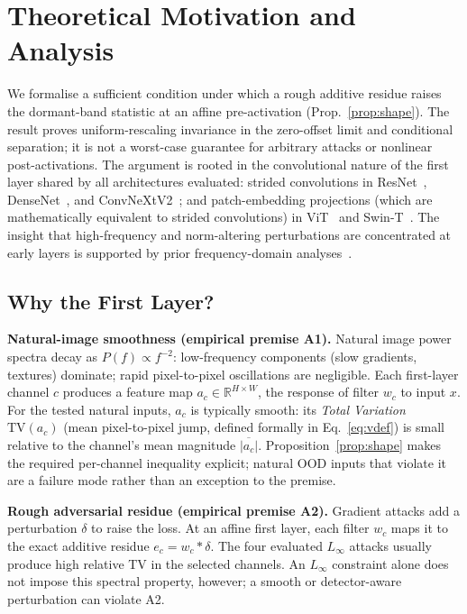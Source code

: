 \documentclass[10pt,letterpaper,journal]{IEEEtran}
\begin{document}
\section{Theoretical Motivation and Analysis}
\label{sec:theory}

We formalise a sufficient condition under which a rough additive residue raises
the dormant-band statistic at an affine pre-activation
(Prop.~\ref{prop:shape}). The result proves uniform-rescaling invariance in the
zero-offset limit and conditional separation; it is not a worst-case guarantee
for arbitrary attacks or nonlinear post-activations. The argument is rooted
in the convolutional nature of the first layer shared by all architectures
evaluated: strided convolutions in ResNet~\cite{he2016deep},
DenseNet~\cite{huang2017densely}, and ConvNeXtV2~\cite{woo2023convnext};
and patch-embedding projections (which are mathematically equivalent to
strided convolutions) in ViT~\cite{dosovitskiy2020image} and
Swin-T~\cite{liu2021swin}. The insight that high-frequency and norm-altering
perturbations are concentrated at early layers is supported by prior
frequency-domain analyses~\cite{wang2020high,wang2020towards,ziyadinov2023low}.

\subsection{Why the First Layer?}
\label{ssec:rawbaseline}

\noindent\textbf{Natural-image smoothness (empirical premise A1).}
Natural image power spectra decay as $P(f)\!\propto\!f^{-2}$: low-frequency
components (slow gradients, textures) dominate; rapid pixel-to-pixel oscillations
are negligible.  Each first-layer channel $c$ produces a feature map
$a_c\in\mathbb{R}^{H\times W}$, the response of filter $w_c$ to input $x$.
For the tested natural inputs, $a_c$ is typically smooth: its
\emph{Total Variation} $\mathrm{TV}(a_c)$ (mean pixel-to-pixel jump, defined
formally in Eq.~\eqref{eq:vdef}) is small relative to the channel's mean
magnitude $\overline{|a_c|}$. Proposition~\ref{prop:shape} makes the required
per-channel inequality explicit; natural OOD inputs that violate it are a
failure mode rather than an exception to the premise.

\noindent\textbf{Rough adversarial residue (empirical premise A2).}
Gradient attacks add a perturbation $\delta$ to raise the loss. At an affine
first layer, each filter $w_c$ maps it to the exact additive residue
$e_c=w_c\!\ast\delta$. The four evaluated $L_\infty$ attacks usually produce
high relative TV in the selected channels. An $L_\infty$ constraint alone does
not impose this spectral property, however; a smooth or detector-aware
perturbation can violate A2.
\end{document}
